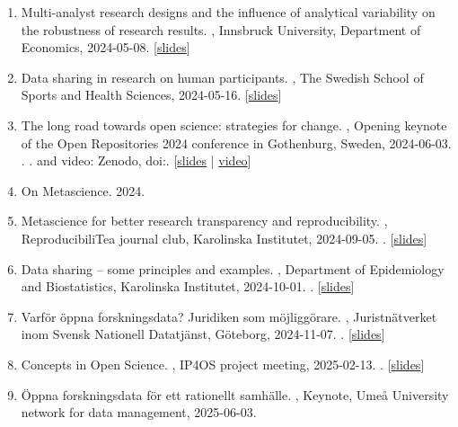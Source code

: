 \documentclass[10pt,a4paper,twocolumn]{article}
\begin{document}
\begin{enumerate}
    \item Multi-analyst research designs and the influence of analytical variability on the robustness of research results. , Innsbruck University, Department of Economics, 2024-05-08. [\href{https://osf.io/rbshd}{slides}]

    \item Data sharing in research on human participants. , The Swedish School of Sports and Health Sciences, 2024-05-16. [\href{https://osf.io/79hcn}{slides}]

    \item The long road towards open science: strategies for change. , Opening keynote of the Open Repositories 2024 conference in Gothenburg, Sweden, 2024-06-03. . . and video: Zenodo, doi:. [\href{https://osf.io/rn8wf}{slides} | \href{https://www.youtube.com/watch?v=svJvq1cot5k}{video}]

    \item On Metascience. 2024.

    \item Metascience for better research transparency and reproducibility. , ReproducibiliTea journal club, Karolinska Institutet, 2024-09-05. . [\href{https://osf.io/9wq8c}{slides}]

    \item Data sharing – some principles and examples. , Department of Epidemiology and Biostatistics, Karolinska Institutet, 2024-10-01. . [\href{https://osf.io/cw5bn}{slides}]

    \item Varför öppna forskningsdata? Juridiken som möjliggörare. , Juristnätverket inom Svensk Nationell Datatjänst, Göteborg, 2024-11-07. . [\href{https://osf.io/ypwm5}{slides}]

    \item Concepts in Open Science. , IP4OS project meeting, 2025-02-13. . [\href{https://osf.io/5r8v9}{slides}]

    \item Öppna forskningsdata för ett rationellt samhälle. , Keynote, Umeå University network for data management, 2025-06-03.

\end{enumerate}


\end{document}
